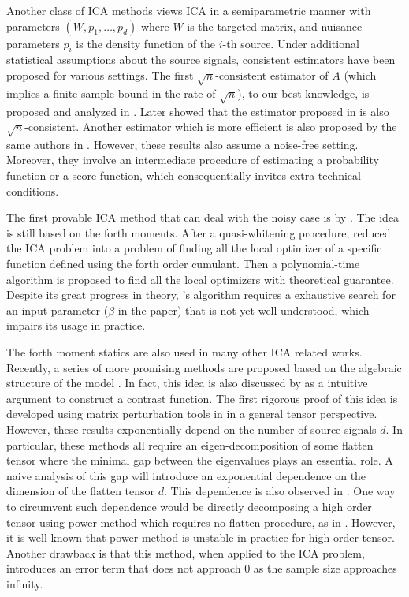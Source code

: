 \documentclass[twoside]{article}
\theoremstyle{definition}
\begin{document}
Another class of ICA methods views ICA in a semiparametric manner with parameters $(W, p_1, \ldots, p_d)$ where $W$ is the targeted matrix, and nuisance parameters $p_i$ is the density function of the $i$-th source. 
Under additional statistical assumptions about the source signals, consistent estimators have been proposed for various settings. The first  $\sqrt{n}$-consistent estimator of $A$ (which implies a finite sample bound in the rate of $\sqrt{n}$), to our best knowledge, is proposed and analyzed in \citet{samarov2004nonparametric}.  
Later \citep{chen2005consistent} showed that the estimator proposed in \citet{eriksson2003characteristic} is also $\sqrt{n}$-consistent. Another estimator which is more efficient is also proposed by the same authors in \citep{chen2006efficient}.
However, these results also assume a noise-free setting. 
Moreover, they involve an intermediate procedure of estimating a probability function or a score function, which consequentially invites extra technical conditions. 

The first provable ICA method that can deal with the noisy case is by \citep{arora2012provable}. 
The idea is still based on the forth moments. 
After a quasi-whitening procedure, \citep{arora2012provable} reduced the ICA problem into a problem of finding all the local optimizer of a specific function defined using the forth order cumulant. Then a polynomial-time algorithm is proposed to find all the local optimizers with theoretical guarantee.
Despite its great progress in theory, \citep{arora2012provable}'s algorithm requires a exhaustive search for an input parameter ($\beta$ in the paper) that is not yet well understood, which impairs its usage in practice.

The forth moment statics are also used in many other ICA related works. 
Recently, a series of more promising methods are proposed based on the algebraic structure of the model \citep{hsu2013learning,anandkumar2012tensordecomposition,anandkumar2012method}. 
In fact, this idea is also discussed by \citet{cardoso1999high} as a intuitive argument to construct a contrast function. 
The first rigorous proof of this idea is developed using matrix perturbation tools in \citep{anandkumar2012tensordecomposition,anandkumar2012method,goyal2014fourier} in a general tensor perspective. 
However, these results exponentially depend on the number of source signals $d$.
In particular, these methods all require an eigen-decomposition of some flatten tensor where the minimal gap between the eigenvalues plays an essential role. 
A naive analysis of this gap will introduce an exponential dependence on the dimension of the flatten tensor $d$. 
This dependence is also observed in \citep{cardoso1999high,goyal2014fourier}.
One way to circumvent such dependence would be directly decomposing a high order tensor using power method which requires no flatten procedure, as in \citep{anandkumar2014guaranteed}. 
However, it is well known that power method is unstable in practice for high order tensor. 
Another drawback is that this method, when applied to the ICA problem, introduces an error term that does not approach 0 as the sample size approaches infinity. 
\end{document}
